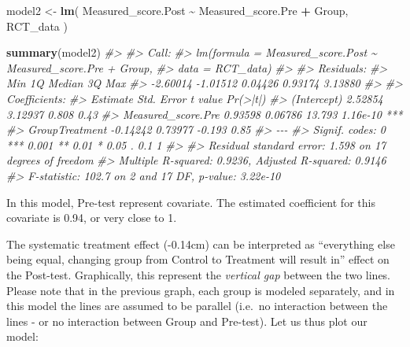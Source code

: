 \documentclass[
]{book}
\newenvironment{Shaded}{\begin{snugshade}}{\end{snugshade}}
\newcommand{\CommentTok}[1]{\textcolor[rgb]{0.56,0.35,0.01}{\textit{#1}}}
\newcommand{\KeywordTok}[1]{\textcolor[rgb]{0.13,0.29,0.53}{\textbf{#1}}}
\newcommand{\NormalTok}[1]{#1}
\newcommand{\OperatorTok}[1]{\textcolor[rgb]{0.81,0.36,0.00}{\textbf{#1}}}
\newcommand{\StringTok}[1]{\textcolor[rgb]{0.31,0.60,0.02}{#1}}
\begin{document}
\begin{Shaded}
\begin{Highlighting}[]
\NormalTok{model2 <{-}}\StringTok{ }\KeywordTok{lm}\NormalTok{(}
\NormalTok{  Measured\_score.Post }\OperatorTok{\textasciitilde{}}\StringTok{ }\NormalTok{Measured\_score.Pre }\OperatorTok{+}\StringTok{ }\NormalTok{Group,}
\NormalTok{  RCT\_data}
\NormalTok{)}

\KeywordTok{summary}\NormalTok{(model2)}
\CommentTok{\#> }
\CommentTok{\#> Call:}
\CommentTok{\#> lm(formula = Measured\_score.Post \textasciitilde{} Measured\_score.Pre + Group, }
\CommentTok{\#>     data = RCT\_data)}
\CommentTok{\#> }
\CommentTok{\#> Residuals:}
\CommentTok{\#>      Min       1Q   Median       3Q      Max }
\CommentTok{\#> {-}2.60014 {-}1.01512  0.04426  0.93174  3.13880 }
\CommentTok{\#> }
\CommentTok{\#> Coefficients:}
\CommentTok{\#>                    Estimate Std. Error t value Pr(>|t|)    }
\CommentTok{\#> (Intercept)         2.52854    3.12937   0.808     0.43    }
\CommentTok{\#> Measured\_score.Pre  0.93598    0.06786  13.793 1.16e{-}10 ***}
\CommentTok{\#> GroupTreatment     {-}0.14242    0.73977  {-}0.193     0.85    }
\CommentTok{\#> {-}{-}{-}}
\CommentTok{\#> Signif. codes:  0 \textquotesingle{}***\textquotesingle{} 0.001 \textquotesingle{}**\textquotesingle{} 0.01 \textquotesingle{}*\textquotesingle{} 0.05 \textquotesingle{}.\textquotesingle{} 0.1 \textquotesingle{} \textquotesingle{} 1}
\CommentTok{\#> }
\CommentTok{\#> Residual standard error: 1.598 on 17 degrees of freedom}
\CommentTok{\#> Multiple R{-}squared:  0.9236,	Adjusted R{-}squared:  0.9146 }
\CommentTok{\#> F{-}statistic: 102.7 on 2 and 17 DF,  p{-}value: 3.22e{-}10}
\end{Highlighting}
\end{Shaded}

In this model, Pre-test represent covariate. The estimated coefficient for this covariate is 0.94, or very close to 1.

The systematic treatment effect (-0.14cm) can be interpreted as ``everything else being equal, changing group from Control to Treatment will result in'' effect on the Post-test. Graphically, this represent the \emph{vertical gap} between the two lines. Please note that in the previous graph, each group is modeled separately, and in this model the lines are assumed to be parallel (i.e.~no interaction between the lines - or no interaction between Group and Pre-test). Let us thus plot our model:
\end{document}
